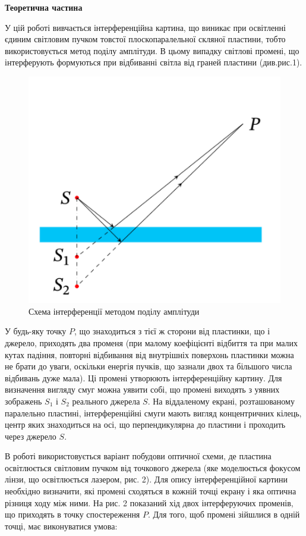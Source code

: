 \begin{center}
    \Large{\textbf{Теоретична частина}}    
\end{center}

\vspace{1mm}

У цій роботі вивчається інтерференційна картина,
що виникає при освітленні єдиним світловим пучком
товстої плоскопаралельної скляної пластини, тобто використовується 
метод поділу амплітуди. В цьому випадку світлові промені, 
що інтерферують формуються при відбиванні світла від граней пластини 
(див.рис.1).

\begin{figure}    
    \centering
    \includegraphics[width=.4\textwidth]{assets/separate_amplitude.png}
    \caption{Схема інтерференції методом поділу амплітуди}
\end{figure}

У будь-яку точку $P$, що знаходиться з тієї 
ж сторони від пластинки, що і джерело, приходять
два променя (при малому коефіцієнті відбиття 
та при малих кутах падіння, повторні відбивання
від внутрішніх поверхонь пластинки можна не брати до уваги,
оскільки енергія пучків, що зазнали двох та більшого
числа відбивань дуже мала). Ці промені утворюють інтерференційну картину.
Для визначення вигляду смуг можна уявити собі, що промені виходять з уявних
зображень $S_1$ і $S_2$ реального джерела $S$. На віддаленому екрані,
розташованому паралельно пластині, інтерференційні смуги мають вигляд концентричних
кілець, центр яких знаходиться на осі, що перпендикулярна до пластини і
проходить через джерело $S$.


В роботі використовується варіант побудови оптичної схеми, де пластина
освітлюється світловим пучком від точкового джерела 
(яке моделюється фокусом лінзи, що освітлюється лазером, рис. 2).
Для опису інтерференційної картини необхідно визначити,
які промені сходяться в кожній точці екрану і яка оптична різниця ходу між ними.
На рис. 2 показаний хід двох інтерферуючих променів, що приходять
в точку спостереження $P$. Для того, щоб промені зійшлися в одній точці, має
виконуватися умова:

